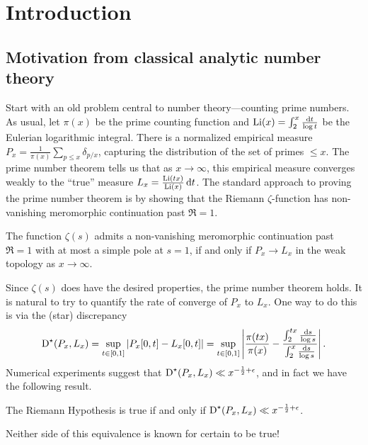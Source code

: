 
\chapter{Introduction}





\section{Motivation from classical analytic number theory}

Start with an old problem central to number theory---counting 
prime numbers. As usual, let $\pi(x)$ be the prime counting function and 
$\operatorname{Li}(x) = \int_2^x \frac{\mathrm{d} t}{\log t}$ be the Eulerian logarithmic integral. 
There is a normalized empirical measure 
$P_x = \frac{1}{\pi(x)} \sum_{p\leqslant x} \delta_{p/x}$, capturing the 
distribution of the set of primes $\leqslant x$. The prime number theorem 
tells us that as $x\to \infty$, this empirical measure converges weakly to the 
``true'' measure $L_x = \frac{\operatorname{Li}(t x)}{\operatorname{Li}(x)}\, \mathrm{d} t$. The standard approach 
to proving the prime number theorem is by showing that the Riemann 
$\zeta$-function has non-vanishing meromorphic continuation past $\Re = 1$.

\begin{theorem}
The function $\zeta(s)$ admits a non-vanishing meromorphic continuation past 
$\Re = 1$ with at most a simple pole at $s=1$, if and only if 
$P_x \to L_x$ in the weak topology as $x\to \infty$. 
\end{theorem}

Since $\zeta(s)$ does have the desired properties, the prime number 
theorem holds. 
It is natural to try to quantify the rate of converge of $P_x$ to $L_x$. One 
way to do this is via the (star) discrepancy 
\[
	\operatorname{D}^\star(P_x,L_x) 
		= \sup_{t\in [0,1]} \left| P_x[0,t] - L_x[0,t]\right|
		= \sup_{t\in [0,1]} \left| \frac{\pi(t x)}{\pi(x)} - \frac{\int_2^{tx} \frac{\mathrm{d} s}{\log s}}{\int_2^x \frac{\mathrm{d} s}{\log s}}\right| .
\]
Numerical experiments suggest that 
$\operatorname{D}^\star(P_x,L_x) \ll x^{-\frac 1 2+\epsilon}$, and in fact we have the 
following result. 

\begin{theorem}
The Riemann Hypothesis is true if and only if 
$\operatorname{D}^\star(P_x,L_x) \ll x^{-\frac 1 2+\epsilon}$. 
\end{theorem}

Neither side of this equivalence is known for certain to be true! 

